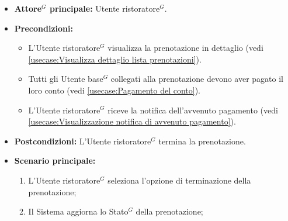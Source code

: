 \label{usecase:Termina prenotazione}
\begin{itemize}
	\item \textbf{\gls{Attore}$^G$ principale:} \gls{Utente ristoratore}$^G$.

	\item \textbf{Precondizioni:}
	      \begin{itemize}
		      \item L'\gls{Utente ristoratore}$^G$ visualizza la prenotazione in dettaglio (vedi \autoref{usecase:Visualizza dettaglio lista prenotazioni}).
		      \item Tutti gli \gls{Utente base}$^G$ collegati alla prenotazione devono aver pagato il loro conto (vedi \autoref{usecase:Pagamento del conto}).
		      \item L'\gls{Utente ristoratore}$^G$ riceve la notifica dell'avvenuto pagamento (vedi \autoref{usecase:Visualizzazione notifica di avvenuto pagamento}).
	      \end{itemize}

	\item \textbf{Postcondizioni:} L'\gls{Utente ristoratore}$^G$ termina la prenotazione.


	\item \textbf{Scenario principale:}
	      \begin{enumerate}
		      \item L'\gls{Utente ristoratore}$^G$ seleziona l'opzione di terminazione della prenotazione;

		      \item Il Sistema aggiorna lo \gls{Stato}$^G$ della prenotazione;
	      \end{enumerate}
\end{itemize}
